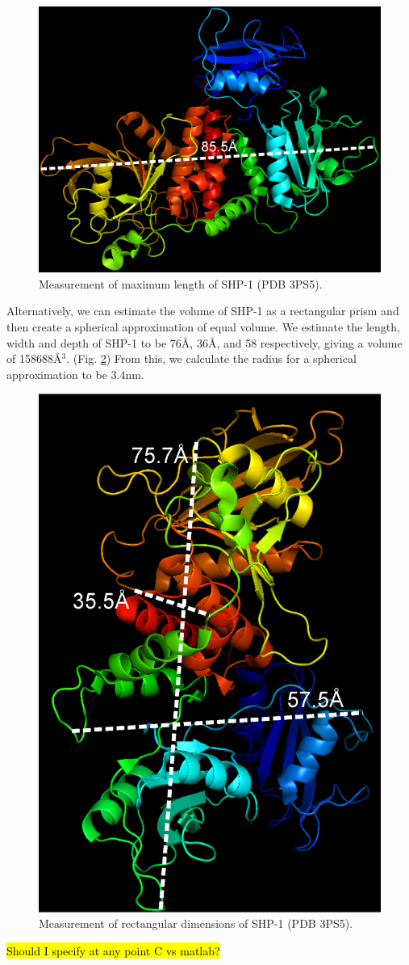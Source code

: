 \documentclass[../../AdvancementSummary.tex]{subfiles}
\begin{document}
\begin{figure}[H]
\begin{center}
\includegraphics[width=0.5\linewidth]{ResultsFigures/SHP1PyMol/Diagonal1.eps}
\end{center}
\caption{Measurement of maximum length of SHP-1 (PDB 3PS5). \label{fig: SHP1Diag}}
\end{figure}

Alternatively, we can estimate the volume of SHP-1 as a rectangular prism and then create a spherical approximation of equal volume. We estimate the length, width and depth of SHP-1 to be 76\AA, 36\AA, and 58\text{\AA} respectively, giving a volume of 158688\AA$^3$.  (Fig. \ref{fig: SHP1Rectangle}) From this, we calculate the radius for a spherical approximation to be 3.4nm.

\begin{figure}[H]
\begin{center}
\includegraphics[width=0.4\linewidth]{ResultsFigures/SHP1PyMol/LengthWidthDepth.eps}
\end{center}
\caption{Measurement of rectangular dimensions of SHP-1 (PDB 3PS5).  \label{fig: SHP1Rectangle} }
\end{figure}

\hl{Should I specify at any point C vs matlab?}
\end{document}
